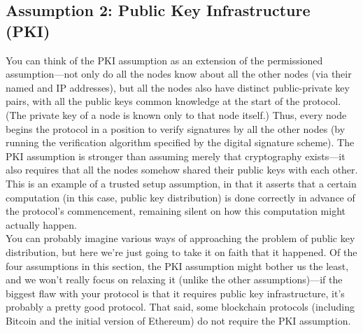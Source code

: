 \subsection{Assumption 2: Public Key Infrastructure (PKI)}
You can think of the PKI assumption as an extension of the permissioned assumption—not
only do all the nodes know about all the other nodes (via their named and IP addresses),
but all the nodes also have distinct public-private key pairs, with all the public keys common
knowledge at the start of the protocol. (The private key of a node is known only to that
node itself.) Thus, every node begins the protocol in a position to verify signatures by all the
other nodes (by running the verification algorithm specified by the digital signature scheme).
The PKI assumption is stronger than assuming merely that cryptography exists—it also
requires that all the nodes somehow shared their public keys with each other. This is an
example of a trusted setup assumption, in that it asserts that a certain computation (in this
case, public key distribution) is done correctly in advance of the protocol’s commencement,
remaining silent on how this computation might actually happen.\\
You can probably imagine various ways of approaching the problem of public key distribution, but here we’re just going to take it on faith that it happened. Of the four assumptions
in this section, the PKI assumption might bother us the least, and we won’t really focus
on relaxing it (unlike the other assumptions)—if the biggest flaw with your protocol is that
it requires public key infrastructure, it’s probably a pretty good protocol. That said, some
blockchain protocols (including Bitcoin and the initial version of Ethereum) do not require
the PKI assumption.

